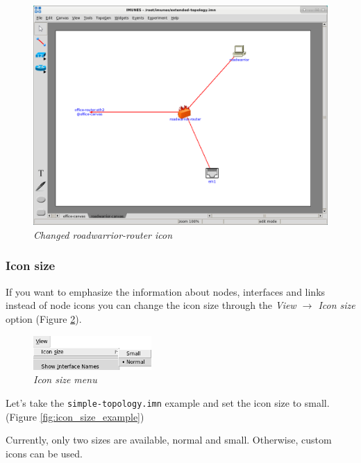 \begin{figure}[H]
	\centering
	\vspace{10pt}
	\includegraphics[width=\textwidth]{./images/changed_node_icon.png}
	\caption{\emph{Changed roadwarrior-router icon}}
	\label{fig:changed_node_icon}
\end{figure}

\subsubsection{Icon size}
If you want to emphasize the information about nodes, interfaces and links
instead of node icons you can change the icon size through the \emph{View $\to$
Icon size} option (Figure \ref{fig:icon_size}).
\begin{figure}[H]
	\centering
	\vspace{10pt}
	\includegraphics[width=0.4\textwidth]{./images/icon_size.png}
	\caption{\emph{Icon size menu}}
	\label{fig:icon_size}
\end{figure}

Let's take the \texttt{simple-topology.imn} example and set the icon size to
small. (Figure \ref{fig:icon_size_example})

Currently, only two sizes are available, normal and small. Otherwise, custom
icons can be used.

